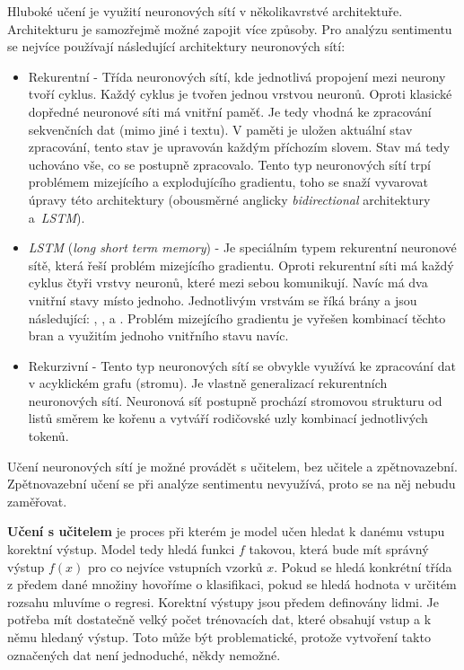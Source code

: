 Hluboké učení je využití neuronových sítí v několikavrstvé architektuře. Architekturu je samozřejmě možné zapojit více způsoby. Pro analýzu sentimentu se nejvíce používají následující architektury neuronových sítí:

\begin{itemize}
    \item Rekurentní - Třída neuronových sítí, kde jednotlivá propojení mezi neurony tvoří cyklus. Každý cyklus je tvořen jednou vrstvou neuronů. Oproti klasické dopředné neuronové síti má vnitřní paměť. Je tedy vhodná ke zpracování sekvenčních dat (mimo jiné i textu). V paměti je uložen aktuální stav zpracování, tento stav je upravován každým příchozím slovem. Stav má tedy uchováno vše, co se postupně zpracovalo. Tento typ neuronových sítí trpí problémem mizejícího a explodujícího gradientu, toho se snaží vyvarovat úpravy této architektury (obousměrné anglicky \emph{bidirectional} architektury a~\emph{LSTM}). 
    \item \emph{LSTM} (\emph{long short term memory}) - Je speciálním typem rekurentní neuronové sítě, která řeší problém mizejícího gradientu. Oproti rekurentní síti má každý cyklus čtyři vrstvy neuronů, které mezi sebou komunikují. Navíc má dva vnitřní stavy místo jednoho. Jednotlivým vrstvám se říká brány a jsou následující: , ,  a . Problém mizejícího gradientu je vyřešen kombinací těchto bran a využitím jednoho vnitřního stavu navíc.
    \item Rekurzivní - Tento typ neuronových sítí se obvykle využívá ke zpracování dat v acyklickém grafu (stromu). Je vlastně generalizací rekurentních neuronových sítí. Neuronová síť postupně prochází stromovou strukturu od listů směrem ke kořenu a vytváří rodičovské uzly kombinací jednotlivých tokenů. 
\end{itemize}

Učení neuronových sítí je možné provádět s učitelem, bez učitele a zpětnovazební. Zpětnovazební učení se při analýze sentimentu nevyužívá, proto se na něj nebudu zaměřovat.  

\textbf{Učení s učitelem} je proces při kterém je model učen hledat k danému vstupu korektní výstup. Model tedy hledá funkci $f$ takovou, která bude mít správný výstup $f(x)$ pro co nejvíce vstupních vzorků $x$. Pokud se hledá konkrétní třída z předem dané množiny hovoříme o klasifikaci, pokud se hledá hodnota v určitém rozsahu mluvíme o regresi. Korektní výstupy jsou předem definovány lidmi. Je potřeba mít dostatečně velký počet trénovacích dat, které obsahují vstup a k němu hledaný výstup. Toto může být problematické, protože vytvoření takto označených dat není jednoduché, někdy nemožné. 

